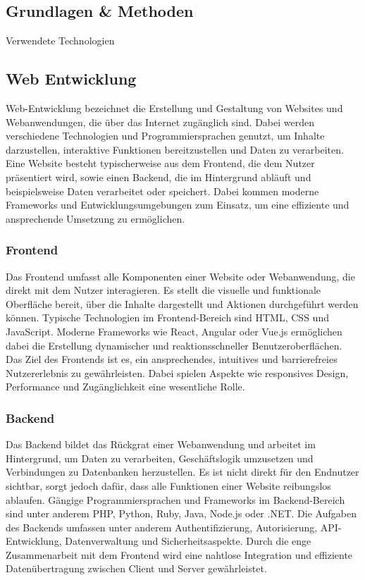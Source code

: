 \begin{inhalt}
\chapter{Grundlagen \& Methoden}
\renewcommand*\chapterpagestyle{scrheadings}

Verwendete Technologien 
\section{Web Entwicklung}

Web-Entwicklung bezeichnet die Erstellung und Gestaltung von Websites und Webanwendungen, die über das Internet zugänglich sind. Dabei werden verschiedene Technologien und Programmiersprachen genutzt, um Inhalte darzustellen, interaktive Funktionen bereitzustellen und Daten zu verarbeiten. Eine Website besteht typischerweise aus dem Frontend, die dem Nutzer präsentiert wird, sowie einen Backend, die im Hintergrund abläuft und beispielsweise Daten verarbeitet oder speichert. Dabei kommen moderne Frameworks und Entwicklungsumgebungen zum Einsatz, um eine effiziente und ansprechende Umsetzung zu ermöglichen. 

\subsection{Frontend} 

Das Frontend umfasst alle Komponenten einer Website oder Webanwendung, die direkt mit dem Nutzer interagieren. Es stellt die visuelle und funktionale Oberfläche bereit, über die Inhalte dargestellt und Aktionen durchgeführt werden können. Typische Technologien im Frontend-Bereich sind HTML, CSS und JavaScript. Moderne Frameworks wie React, Angular oder Vue.js ermöglichen dabei die Erstellung dynamischer und reaktionsschneller Benutzeroberflächen. Das Ziel des Frontends ist es, ein ansprechendes, intuitives und barrierefreies Nutzererlebnis zu gewährleisten. Dabei spielen Aspekte wie responsives Design, Performance und Zugänglichkeit eine wesentliche Rolle.

\subsection{Backend}

Das Backend bildet das Rückgrat einer Webanwendung und arbeitet im Hintergrund, um Daten zu verarbeiten, Geschäftslogik umzusetzen und Verbindungen zu Datenbanken herzustellen. Es ist nicht direkt für den Endnutzer sichtbar, sorgt jedoch dafür, dass alle Funktionen einer Website reibungslos ablaufen. Gängige Programmiersprachen und Frameworks im Backend-Bereich sind unter anderem PHP, Python, Ruby, Java, Node.js oder .NET. Die Aufgaben des Backends umfassen unter anderem Authentifizierung, Autorisierung, API-Entwicklung, Datenverwaltung und Sicherheitsaspekte. Durch die enge Zusammenarbeit mit dem Frontend wird eine nahtlose Integration und effiziente Datenübertragung zwischen Client und Server gewährleistet.


\end{inhalt}
